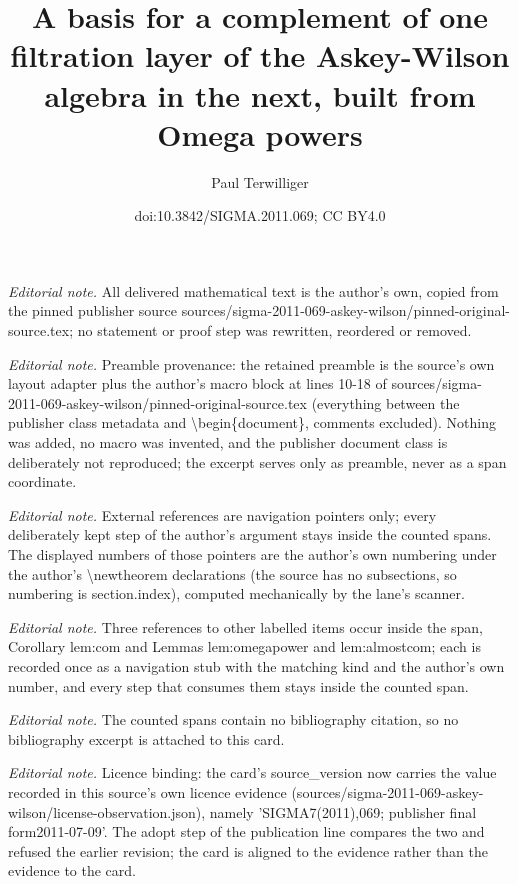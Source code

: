 \documentclass[10pt,a4paper]{amsart}
\title{A basis for a complement of one filtration layer of the Askey-Wilson algebra in the next, built from Omega powers}
\author{Paul Terwilliger}
\date{doi:10.3842/SIGMA.2011.069; CC BY4.0}
\begin{document}
\maketitle
\noindent\textit{Editorial note.} All delivered mathematical text is the author's own, copied from the pinned publisher source sources/sigma-2011-069-askey-wilson/pinned-original-source.tex; no statement or proof step was rewritten, reordered or removed.\par\medskip
\noindent\textit{Editorial note.} Preamble provenance: the retained preamble is the source's own layout adapter plus the author's macro block at lines 10-18 of sources/sigma-2011-069-askey-wilson/pinned-original-source.tex (everything between the publisher class metadata and \textbackslash{}begin\{document\}, comments excluded). Nothing was added, no macro was invented, and the publisher document class is deliberately not reproduced; the excerpt serves only as preamble, never as a span coordinate.\par\medskip
\noindent\textit{Editorial note.} External references are navigation pointers only; every deliberately kept step of the author's argument stays inside the counted spans. The displayed numbers of those pointers are the author's own numbering under the author's \textbackslash{}newtheorem declarations (the source has no subsections, so numbering is section.index), computed mechanically by the lane's scanner.\par\medskip
\noindent\textit{Editorial note.} Three references to other labelled items occur inside the span, Corollary lem:com and Lemmas lem:omegapower and lem:almostcom; each is recorded once as a navigation stub with the matching kind and the author's own number, and every step that consumes them stays inside the counted span.\par\medskip
\noindent\textit{Editorial note.} The counted spans contain no bibliography citation, so no bibliography excerpt is attached to this card.\par\medskip
\noindent\textit{Editorial note.} Licence binding: the card's source\_version now carries the value recorded in this source's own licence evidence (sources/sigma-2011-069-askey-wilson/license-observation.json), namely 'SIGMA7(2011),069; publisher final form2011-07-09'. The adopt step of the publication line compares the two and refused the earlier revision; the card is aligned to the evidence rather than the evidence to the card.\par\medskip
\end{document}

